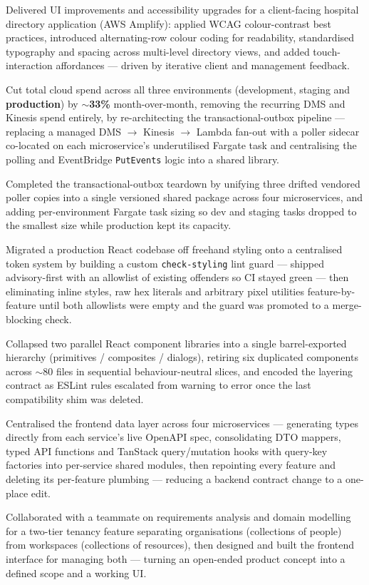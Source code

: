 \documentclass[letterpaper,11pt]{article}
\newcommand{\resumeItem}[1]{
  \item\small #1
}
\begin{document}
                \resumeItem{Delivered UI improvements and accessibility upgrades for a client-facing hospital directory application (AWS Amplify): applied WCAG colour-contrast best practices, introduced alternating-row colour coding for readability, standardised typography and spacing across multi-level directory views, and added touch-interaction affordances --- driven by iterative client and management feedback.}
                \resumeItem{Cut total cloud spend across all three environments (development, staging and \textbf{production}) by \textbf{$\sim$33\%} month-over-month, removing the recurring DMS and Kinesis spend entirely, by re-architecting the transactional-outbox pipeline --- replacing a managed DMS $\rightarrow$ Kinesis $\rightarrow$ Lambda fan-out with a poller sidecar co-located on each microservice's underutilised Fargate task and centralising the polling and EventBridge \texttt{PutEvents} logic into a shared library.}
                \resumeItem{Completed the transactional-outbox teardown by unifying three drifted vendored poller copies into a single versioned shared package across four microservices, and adding per-environment Fargate task sizing so dev and staging tasks dropped to the smallest size while production kept its capacity.}
                \resumeItem{Migrated a production React codebase off freehand styling onto a centralised token system by building a custom \texttt{check-styling} lint guard --- shipped advisory-first with an allowlist of existing offenders so CI stayed green --- then eliminating inline styles, raw hex literals and arbitrary pixel utilities feature-by-feature until both allowlists were empty and the guard was promoted to a merge-blocking check.}
                \resumeItem{Collapsed two parallel React component libraries into a single barrel-exported hierarchy (primitives / composites / dialogs), retiring six duplicated components across $\sim$80 files in sequential behaviour-neutral slices, and encoded the layering contract as ESLint rules escalated from warning to error once the last compatibility shim was deleted.}
                \resumeItem{Centralised the frontend data layer across four microservices --- generating types directly from each service's live OpenAPI spec, consolidating DTO mappers, typed API functions and TanStack query/mutation hooks with query-key factories into per-service shared modules, then repointing every feature and deleting its per-feature plumbing --- reducing a backend contract change to a one-place edit.}
                \resumeItem{Collaborated with a teammate on requirements analysis and domain modelling for a two-tier tenancy feature separating organisations (collections of people) from workspaces (collections of resources), then designed and built the frontend interface for managing both --- turning an open-ended product concept into a defined scope and a working UI.}
\end{document}
